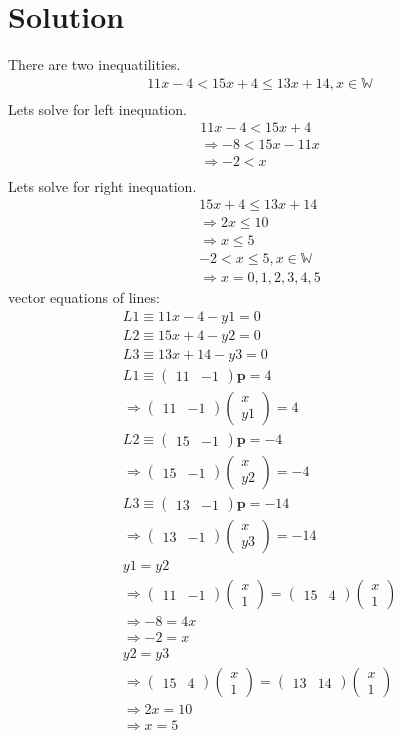 \documentclass[12pt,two column]{article}
\newcommand{\myvec}[1]{\ensuremath{\begin{pmatrix}#1\end{pmatrix}}}
\let\vec\mathbf
\begin{document}
 \section*{Solution}
There are two inequatilities.\\
\begin{align*}
 11x-4 < 15x+4\le13x+14,  x\in \mathbb{W}\\
\end{align*}
Lets solve for left inequation.
\begin{align*}
 11x-4<15x+4\\
 \Rightarrow -8<15x-11x\\
 \Rightarrow-2<x\\
\end{align*}
 Lets solve for right inequation.\\
\begin{align*}
  15x+4\le13x+14\\
\Rightarrow 2x\le10\\
\Rightarrow x\le5\\
 -2 < x\le5,
x\in \mathbb{W}\\
\Rightarrow x=0,1,2,3,4,5 
\end{align*}
vector equations of lines:
\begin{align*}

 L1 \equiv 11x-4-y1=0\\
L2 \equiv 15x+4-y2=0\\
L3 \equiv 13x+14-y3=0\\

L1 \equiv \myvec{11 & -1} \vec{p}=4\\
\Rightarrow \myvec{11 & -1} \myvec{x \\ y1}=4\\
L2 \equiv \myvec{15 & -1} \vec{p}=-4\\
\Rightarrow \myvec{15 & -1} \myvec{x \\ y2}=-4\\
L3 \equiv \myvec{13 & -1} \vec{p}=-14\\
\Rightarrow \myvec{13 & -1} \myvec{x \\ y3}=-14\\  

y1=y2\\
\Rightarrow \myvec{11 & -1}\myvec{x\\1}=\myvec{15 & 4} \myvec{x \\ 1}\\
\Rightarrow -8=4x\\
\Rightarrow -2=x\\
y2=y3\\
\Rightarrow \myvec{15 & 4}\myvec{x\\1}=\myvec{13 & 14} \myvec{x \\ 1}\\
\Rightarrow 2x=10\\
\Rightarrow x=5\\
\end{align*}
\end{document}
